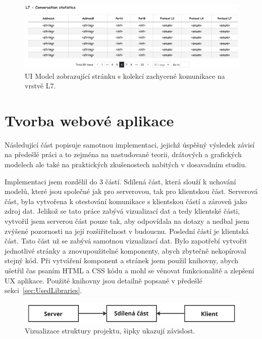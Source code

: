     \begin{figure}[H]
        \centering
        \includegraphics[scale=0.45]{obrazky-figures/NavrhUXUI/UIModels/L7List.png}
        \caption{\gls{UI} Model zobrazující stránku s kolekcí zachycené komunikace na vrstvě L7.}
        \label{fig:L7ListUIModel}
    \end{figure}



\section{Tvorba webové aplikace}
    Následující část popisuje samotnou implementaci, jejichž úspěšný výsledek závisí na předešlé práci a to zejména na nastudované teorii, drátových a grafických modelech ale také na praktických zkušenostech nabitých v dosavadním studiu. 
    
    Implementaci jsem rozdělil do 3 částí. Sdílená část, která slouží k uchování modelů, které jsou společné jak pro serverovou, tak pro klientskou část. Serverová část, byla vytvořena k otestování komunikace s klientskou částí a zároveň jako zdroj dat. Jelikož se tato práce zabývá vizualizací dat a tedy klientské části, vytvořil jsem serverou část pouze tak, aby odpovídala na dotazy a nedbal jsem zvýšené pozornosti na její rozšiřitelnost v budoucnu. Poslední částí je klientská část. Tato část už se zabývá samotnou vizualizací dat. Bylo zapotřebí vytvořit jednotlivé stránky a znovupoužitelné komponenty, abych zbytečně nekopíroval stejný kód. Při vytváření komponent a stránek jsem použil knihovny, abych ušetřil čas psaním HTML a CSS kódu a mohl se věnovat funkcionalitě a zlepšení \gls{UX} aplikace. Použité knihovny jsou detailně popsané v předešlé sekci~\ref{sec:UsedLibraries}.

    \begin{figure}[H]
        \centering
        \includegraphics[scale=0.12]{obrazky-figures/Implementace/AppStructure.jpg}
        \caption{Vizualizace struktury projektu, šipky ukazují závislost.}
        \label{fig:my_label}
    \end{figure}


